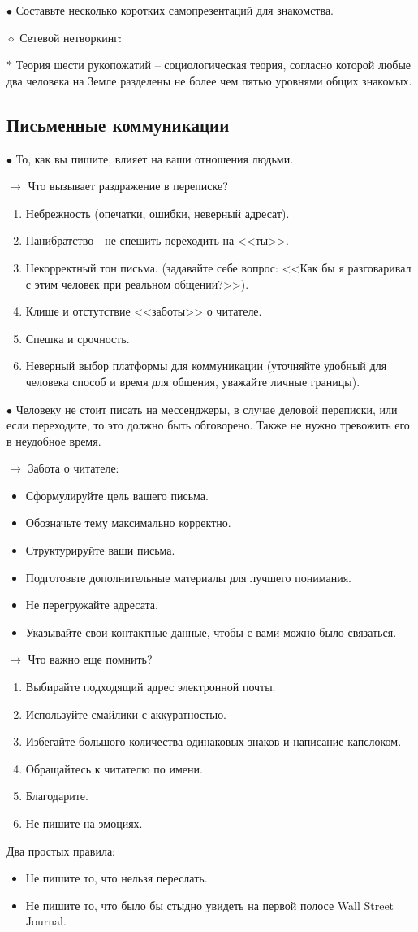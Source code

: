 \documentclass[12pt,a4paper]{report}
\begin{document}
\smallskip 
$\bullet$ Составьте несколько коротких самопрезентаций для знакомства.

\bigskip
$\diamond$ Сетевой нетворкинг: 

\smallskip
$\ast$ Теория шести рукопожатий -- социологическая теория, согласно которой любые два человека на Земле разделены не более чем пятью уровнями общих знакомых.


\subsection*{Письменные коммуникации}
$\bullet$ То, как вы пишите, влияет на ваши отношения людьми.

\bigskip
$\rightarrow$ Что вызывает раздражение в переписке?
\begin{enumerate}
	\item Небрежность (опечатки, ошибки, неверный адресат).
	\item Панибратство - не спешить переходить на <<ты>>.
	\item Некорректный тон письма. (задавайте себе вопрос: <<Как бы я разговаривал с этим человек при реальном общении?>>).
	\item Клише и отстутствие <<заботы>> о читателе.
	\item Спешка и срочность.
	\item Неверный выбор платформы для коммуникации (уточняйте удобный для человека способ и время для общения, уважайте личные границы).
\end{enumerate}

$\bullet$ Человеку не стоит писать на мессенджеры, в случае деловой переписки, или если переходите, то это должно быть обговорено. Также не нужно тревожить его в неудобное время.

\newpage
\medskip
$\rightarrow$ Забота о читателе:
\begin{itemize}
	\item Сформулируйте цель вашего письма.
	\item Обозначьте тему максимально корректно.
	\item Структурируйте ваши письма.
	\item Подготовьте дополнительные материалы для лучшего понимания.
	\item Не перегружайте адресата.
	\item Указывайте свои контактные данные, чтобы с вами можно было связаться.
\end{itemize}

\medskip 
$\rightarrow$ Что важно еще помнить?
\begin{enumerate}
	\item Выбирайте подходящий адрес электронной почты.
	\item Используйте смайлики с аккуратностью.
	\item Избегайте большого количества одинаковых знаков и написание капслоком.
	\item Обращайтесь к читателю по имени.
	\item Благодарите.
	\item Не пишите на эмоциях.
\end{enumerate}

\bigskip 
Два простых правила: 
\begin{itemize}
	\item[\checkmark] Не пишите то, что нельзя переслать. 
	\item[\checkmark] Не пишите то, что было бы стыдно увидеть на первой полосе Wall Street Journal.
\end{itemize}
\end{document}
